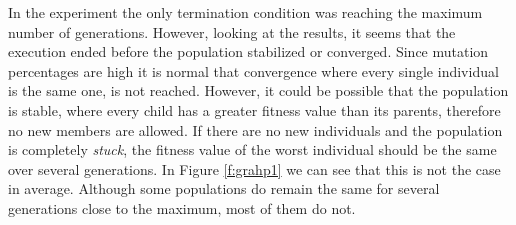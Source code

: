 \documentclass[a4paper,twoside]{article}
\begin{document}
In the experiment the only termination condition was reaching the maximum 
number of generations. However, looking at the results, it seems that the 
execution ended before the population stabilized or converged. Since mutation 
percentages are high it is normal that convergence where every single 
individual is the same one, is not reached. However, it could be possible that 
the population is stable, where every child has a greater fitness value than 
its parents, therefore no new members are allowed. If there are no new 
individuals and the population is completely \textit{stuck}, the fitness value 
of the worst individual should be the same over several generations. In Figure 
\ref{f:grahp1} we can see that this is not the case in average. Although some 
populations do remain the same for several generations close to the maximum, 
most of them do not.
\end{document}
